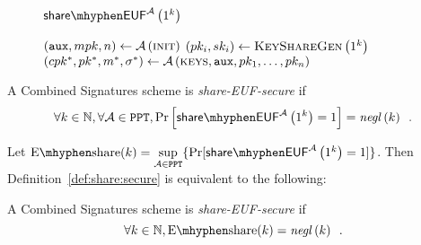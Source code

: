   \begin{figure}[!htbp]
    \begin{gamebox}{$\mathsf{share \mhyphen
    EUF}^{\adversary}\left(1^k\right)$}
      \begin{algorithmic}[1]
        \State $\left(\mathtt{aux}, mpk, n\right) \gets
        \mathcal{A}\left(\textsc{init}\right)$
          \State $\left(pk_i, sk_i\right) \gets
          \textsc{KeyShareGen}\left(1^k\right)$
        \EndFor
        \State $\left(cpk^*, pk^*, m^*, \sigma^*\right) \gets
        \mathcal{A}\left(\textsc{keys}, \mathtt{aux}, pk_1, \dots, pk_n\right)$
          \State {}
        \Else
          \State {}
        \EndIf
      \end{algorithmic}
    \end{gamebox}
    \caption{}
    \label{game:comb:share}
  \end{figure}
  \begin{definition}
    \label{def:share:secure}
    A Combined Signatures scheme is \emph{\textsf{share-EUF}-secure} if
    \begin{equation*}
      \forall k \in \mathbb{N}, \forall \adversary \in \mathtt{PPT},
      \Pr\left[\mathsf{share \mhyphen EUF}^{\adversary}\left(1^k\right) =
      1\right] = \mathit{negl}\left(k\right) \enspace.
    \end{equation*}
  \end{definition}

  Let $\mathrm{E \mhyphen share}(k) = \underset{\adversary \in
  \mathtt{PPT}}{\sup}\{\Pr[\mathsf{share \mhyphen
  EUF}^{\adversary}\left(1^k\right) = 1]\}$. Then
  Definition~\ref{def:share:secure} is equivalent to the following:

  \begin{definition}
    \label{def:share:secure:sup}
    A Combined Signatures scheme is \emph{\textsf{share-EUF}-secure} if
    \begin{equation*}
      \forall k \in \mathbb{N}, \mathrm{E \mhyphen share}(k) =
      \mathit{negl}\left(k\right) \enspace.
    \end{equation*}
  \end{definition}

